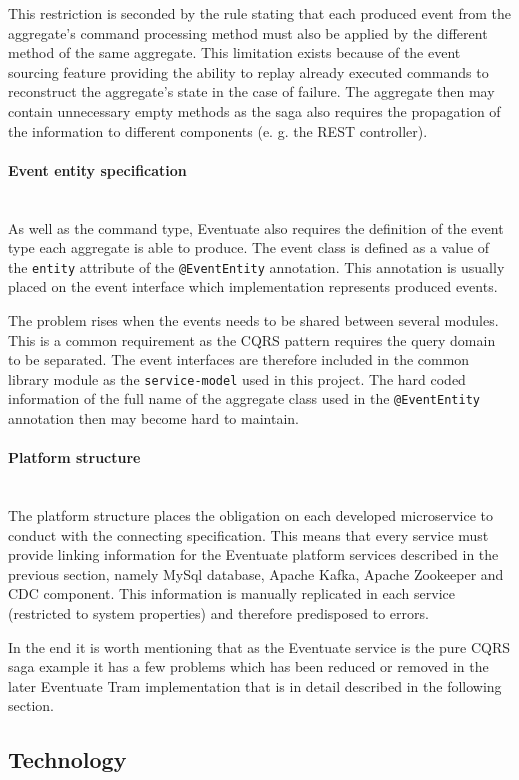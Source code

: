 \documentclass[oneside,
  digital, %
  table,   %
  nolof,     %
  nolot,     %
]{fithesis3}
\newcommand{\newlinepar}[1]{\paragraph{#1}\needspace{4\baselineskip}\mbox{}\\}
\begin{document}
This restriction is seconded by the rule stating that each produced event from the aggregate's command processing method must also be applied by the different method of the same aggregate. This limitation exists because of the event sourcing feature providing the ability to replay already executed commands to reconstruct the aggregate's state in the case of failure. The aggregate then may contain unnecessary empty methods as the saga also requires the propagation of the information to different components (e. g. the REST controller).


\newlinepar{Event entity specification}

As well as the command type, Eventuate also requires the definition of the event type each aggregate is able to produce. The event class is defined as a value of the \texttt{entity} attribute of the \texttt{@EventEntity} annotation. This annotation is usually placed on the event interface which implementation represents produced events.

The problem rises when the events needs to be shared between several modules. This is a common requirement as the CQRS pattern requires the query domain to be separated. The event interfaces are therefore included in the common library module as the \texttt{service-model} used in this project. The hard coded information of the full name of the aggregate class used in the \texttt{@EventEntity} annotation then may become hard to maintain.

\newlinepar{Platform structure}

The platform structure places the obligation on each developed microservice to conduct with the connecting specification. This means that every service must provide linking information for the Eventuate platform services described in the previous section, namely MySql database, Apache Kafka, Apache Zookeeper and CDC component. This information is manually replicated in each service (restricted to system properties) and therefore predisposed to errors.

\hfill \break

In the end it is worth mentioning that as the Eventuate service is the pure CQRS saga example it has a few problems which has been reduced or removed in the later Eventuate Tram implementation that is in detail described in the following section. 

\subsection{Technology}
\label{sec:eventuate-technology}
\end{document}

